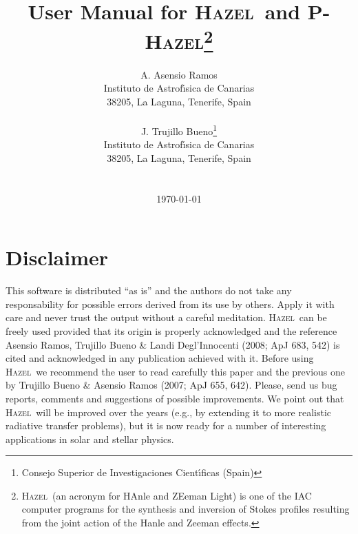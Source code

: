 \documentclass[12pt]{article}
\def\H{\textsc{Hazel}}
\def\HM{\textsc{P-Hazel}}
\begin{document}
\title                  {\sc User Manual for \H\ and \HM\footnote{\H\ (an acronym for HAnle and ZEeman Light) is one of the IAC computer
programs for the synthesis and inversion of Stokes profiles resulting from the joint action of the Hanle and Zeeman effects.}}

\author{ A. Asensio Ramos \\
         Instituto de Astrof\'{\i}sica de Canarias\\
         38205, La Laguna, Tenerife, Spain\\ \\
        J. Trujillo Bueno\footnote{Consejo Superior de Investigaciones Cient\'{\i}ficas (Spain)}\\
	Instituto de Astrof\'{\i}sica de Canarias\\
         38205, La Laguna, Tenerife, Spain\\ \\
        \\[0.5in] \today}
\date{}
\maketitle

\newpage

\tableofcontents

\newpage

\section*{Disclaimer}

This software is distributed ``as is'' and the authors do not take any responsability for
possible errors derived from its use by others. Apply it with care and
never trust the output without a careful meditation. \H\ can be freely used
provided that its origin is properly acknowledged and the reference Asensio Ramos, 
Trujillo Bueno \& Landi Degl'Innocenti (2008; ApJ 683, 542) is cited and acknowledged in any
publication achieved with it. Before using \H\ we recommend the user to read carefully this
paper and the previous one by Trujillo Bueno \& Asensio Ramos (2007; ApJ 655, 642). Please, 
send us bug reports, comments and suggestions of possible improvements.
We point out that \H\ will be improved over the years (e.g., by extending it to more
realistic radiative transfer problems), but it is now ready for a number of
interesting applications in solar and stellar physics.
\end{document}
